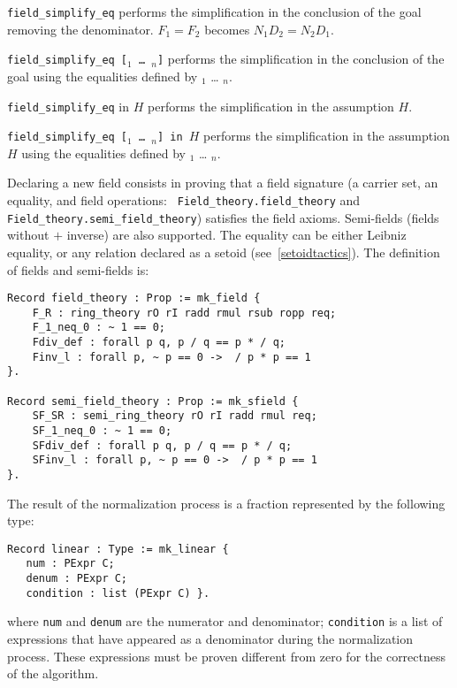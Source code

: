 \begin{Variants}
  \item {\tt field\_simplify\_eq}
     performs the simplification in the conclusion of the goal removing
     the denominator. $F_1 = F_2$
     becomes $N_1 D_2 = N_2  D_1$.

  \item {\tt field\_simplify\_eq   [\term$_1$ {\ldots} \term$_n$]}
     performs the simplification in the conclusion of the goal using
    the equalities
    defined by \term$_1$ {\ldots} \term$_n$. 

  \item {\tt field\_simplify\_eq} in $H$
     performs the simplification in the assumption $H$.

  \item {\tt field\_simplify\_eq   [\term$_1$ {\ldots} \term$_n$] in $H$}
     performs the simplification in the assumption $H$ using
    the equalities
    defined by \term$_1$ {\ldots} \term$_n$. 
\end{Variants}


Declaring a new field consists in proving that a field signature (a
carrier set, an equality, and field operations: {\tt
Field\_theory.field\_theory} and {\tt Field\_theory.semi\_field\_theory})
satisfies the field axioms. Semi-fields (fields without $+$ inverse) are
also supported. The equality can be either Leibniz equality, or any
relation declared as a setoid (see~\ref{setoidtactics}). The definition
of fields and semi-fields is:
\begin{verbatim}
Record field_theory : Prop := mk_field {
    F_R : ring_theory rO rI radd rmul rsub ropp req;
    F_1_neq_0 : ~ 1 == 0;
    Fdiv_def : forall p q, p / q == p * / q;
    Finv_l : forall p, ~ p == 0 ->  / p * p == 1
}.

Record semi_field_theory : Prop := mk_sfield {
    SF_SR : semi_ring_theory rO rI radd rmul req;
    SF_1_neq_0 : ~ 1 == 0;
    SFdiv_def : forall p q, p / q == p * / q;
    SFinv_l : forall p, ~ p == 0 ->  / p * p == 1
}.
\end{verbatim}

The result of the normalization process is a fraction represented by
the following type:
\begin{verbatim}
Record linear : Type := mk_linear {
   num : PExpr C;
   denum : PExpr C;
   condition : list (PExpr C) }.
\end{verbatim}
where {\tt num} and {\tt denum} are the numerator and denominator;
{\tt condition} is a list of expressions that have appeared as a
denominator during the normalization process. These expressions must
be proven different from zero for the correctness of the algorithm.


